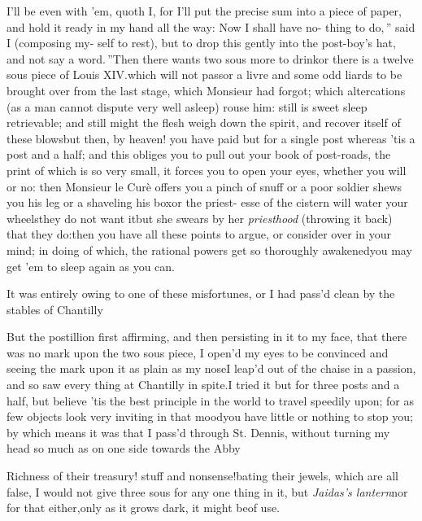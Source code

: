 \documentclass{article}
\begin{document}
\tsh I’ll be even with ’em, quoth I,\break
for I’ll put the precise sum into a piece\break
of paper, and hold it ready in my hand\break
all the way: \lqq Now I shall have no-\break
\lqq thing to do,\,” said I (composing my-\break
self to rest), \lqq but to drop this gently\break
\lqq into the post-boy’s hat, and not say\break
\lqq a word.\,”\tsh Then there wants two\break
sous more to drink\tsh or there is a
twelve sous piece of Louis XIV.\@ which will not pass\tsk or a livre and some odd liards
to be brought over from the last stage, which Monsieur had forgot; which
altercations (as a man cannot dispute very well asleep) rouse him: still is sweet
sleep retrievable; and still might the flesh weigh down the spirit, and recover
itself of these blows\tsk but then, by heaven!
you have paid but for a single post\break
\tsk whereas ’tis a post and a half; and this obliges you to pull out your book of
post-roads, the print of which is so very small, it forces you to open your eyes,
whether you will or no: then Monsieur le Curè offers you a pinch of snuff\tsh\break
or a poor soldier shews you his leg\tsh\break
or a shaveling his box\tsh or the priest-\break
esse of the
cistern will water your wheels\break\tsh they do not want it\tsh but she\break
swears by her \textit{priesthood} (throwing it back) that they do:\tsh then you have all these
points to argue, or consider over in your mind; in doing of which, the rational
powers get so thoroughly awakened\tsh you may get ’em to sleep again as you can.

It was entirely owing to one of these misfortunes, or I had
pass’d clean by the stables of
Chantilly\tsh

\tsh But the postillion first affirming, and then
persisting in it to my face, that there was no mark upon the two
sous piece, I open’d my eyes to be convinced\break
\tsk and seeing
the mark upon it as plain as my nose\tsk I leap’d out of
the chaise in a passion, and so saw every thing at Chantilly
in spite.\tsh I tried it but for three posts and a half,
but believe ’tis the best principle in the world to travel
speedily upon; for as few objects look very inviting in that
mood\tsk you have little or nothing to stop you; by which means
it was that I pass’d through St. Dennis, without turning my
head so much as on one side towards the Abby\tsh

\tsh Richness of their treasury! stuff and nonsense!\tsh bating their jewels, which are
all false, I would not give three sous for any one thing in it, but \textit{Jaidas’s
lantern}\tsh nor for that either,\break only as it grows dark, it might be\break of use.
\end{document}
